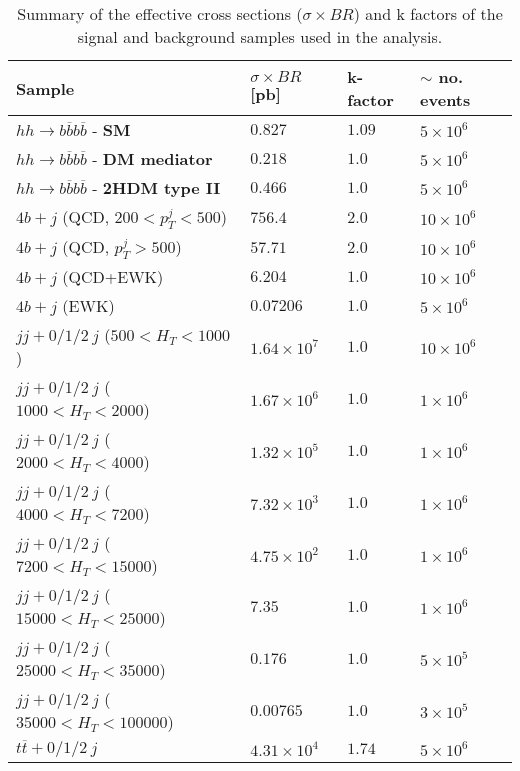 \begin{table}
	\centering
	\caption{Summary of the effective cross sections ($\sigma\times BR$) and k factors of the signal and background samples used in the analysis.}
	\begin{tabular}{llll}
		\toprule 
		\textbf{Sample} & $\sigma\times BR$ [pb] & k-factor & $\sim$ no. events \\
		\midrule
		$hh\rightarrow b\overline{b}b\overline{b}$ - \textbf{SM} & $0.827$ & $1.09$ & $5\times 10^6$\\
		\rowcolor{black!7} $hh\rightarrow b\overline{b}b\overline{b}$ - \textbf{DM mediator} & $0.218$ & $1.0$ & $5\times 10^6$\\
		$hh\rightarrow b\overline{b}b\overline{b}$ - \textbf{2HDM type II} & $0.466$ & $1.0$ & $5\times 10^6$\\
		\rowcolor{black!7} $4b+j$ (QCD, $200<p_T^j<500$)& $756.4$ & $2.0$ & $10\times 10^6$\\
		$4b+j$ (QCD, $p_T^j>500$)& $57.71$ & $2.0$ & $10\times 10^6$\\
		\rowcolor{black!7}$4b+j$ (QCD+EWK) & $6.204$ & $1.0$ & $10\times 10^6$\\
		$4b+j$ (EWK)& $0.07206$ & $1.0$ & $5\times 10^6$\\
		\rowcolor{black!7} $jj+0/1/2 ~j$ ($500<H_T<1000$) & $1.64\times 10^7$ &$1.0$&$10\times 10^6$\\
		$jj+0/1/2 ~j$ ($1000<H_T<2000$) & $1.67\times 10^6$ &$1.0$ & $1\times 10^6$\\
		\rowcolor{black!7}$jj+0/1/2 ~j$ ($2000<H_T<4000$) & $1.32\times 10^5$ & $1.0$&$1\times 10^6$\\
		$jj+0/1/2 ~j$ ($4000<H_T<7200$) & $7.32\times 10^3$ & $1.0$&$1\times 10^6$\\
		\rowcolor{black!7}$jj+0/1/2 ~j$ ($7200<H_T<15000$) & $4.75\times 10^2$ & $1.0$&$1\times 10^6$\\
		$jj+0/1/2 ~j$ ($15000<H_T<25000$) & $7.35$ & $1.0$&$1\times 10^6$\\
		\rowcolor{black!7}$jj+0/1/2 ~j$ ($25000<H_T<35000$) & $0.176$ & $1.0$&$5\times 10^5$\\
		$jj+0/1/2 ~j$ ($35000<H_T<100000$) & $0.00765$ & $1.0$&$3\times 10^5$\\
		\rowcolor{black!7}$t\overline{t}+0/1/2 ~j$ & $4.31	\times 10^4$ & $1.74$ &$5\times 10^6$\\
		\bottomrule
	\end{tabular}
	\label{table:samples_summary}
\end{table}

